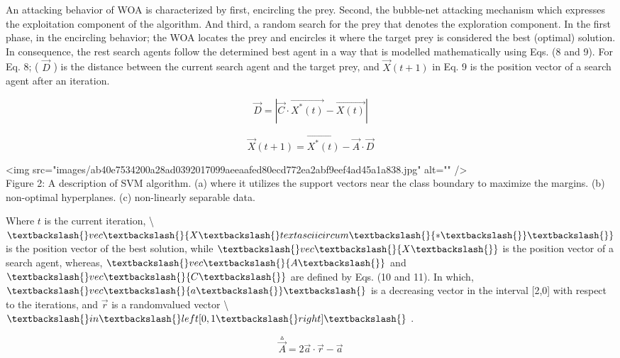 \documentclass{article}
\begin{document}
An attacking behavior of WOA is characterized by first, encircling the prey. Second, the bubble-net attacking mechanism which expresses the exploitation component of the algorithm. And third, a random search for the prey that denotes the exploration component. In the first phase, in the encircling behavior; the WOA locates the prey and encircles it where the target prey is considered the best (optimal) solution. In consequence, the rest search agents follow the determined best agent in a way that is modelled mathematically using Eqs. (8 and 9). For Eq. 8; ( $\vec{D}$ ) is the distance between the current search agent and the target prey, and $\vec{X}(t+1)$ in Eq. 9 is the position vector of a search agent after an iteration.

\begin{equation}
\vec{D}=|\vec{C}\cdot\vec{X^{*}(t)}-\vec{X(t)}|
\end{equation}



\begin{equation}
\vec{X}(t+1)=\vec{X^{*}(t)}-\vec{A}\cdot\vec{D}
\end{equation}



<img src="images/ab40e7534200a28ad0392017099aeeaafed80ecd772ea2abf9eef4ad45a1a838.jpg" alt="" />\\
Figure 2: A description of SVM algorithm. (a) where it utilizes the support vectors near the class boundary to maximize the margins. (b) non-optimal hyperplanes. (c) non-linearly separable data.

Where $t$ is the current iteration, \textbackslash{}$\textbackslash{}vec\textbackslash{}{X\textbackslash{}textasciicircum{}\textbackslash{}{*\textbackslash{}}\textbackslash{}}$ is the position vector of the best solution, while $\textbackslash{}vec\textbackslash{}{X\textbackslash{}}$ is the position vector of a search agent, whereas, $\textbackslash{}vec\textbackslash{}{A\textbackslash{}}$ and $\textbackslash{}vec\textbackslash{}{C\textbackslash{}}$ are defined by Eqs. (10 and 11). In which, $\textbackslash{}vec\textbackslash{}{a\textbackslash{}}\textbackslash{}$ is a decreasing vector in the interval [2,0] with respect to the iterations, and $\vec{r}$ is a randomvalued vector \textbackslash{}$\textbackslash{}in\textbackslash{}left[0,1\textbackslash{}right]\textbackslash{}$ .

\begin{equation}
\overset{\vartriangle}{\vec{A}}=2\vec{a}\cdot\vec{r}-\vec{a}
\end{equation}
\end{document}
